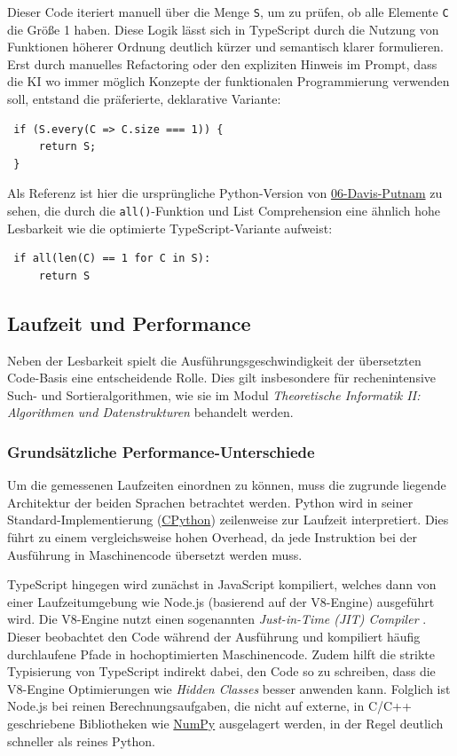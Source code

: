 Dieser Code iteriert manuell über die Menge \texttt{S}, um zu prüfen, ob alle Elemente \texttt{C} die Größe 1 haben. Diese Logik lässt sich in TypeScript durch die Nutzung von Funktionen höherer Ordnung deutlich kürzer und semantisch klarer formulieren. Erst durch manuelles Refactoring oder den expliziten Hinweis im Prompt, dass die KI wo immer möglich Konzepte der funktionalen Programmierung verwenden soll, entstand die präferierte, deklarative Variante:
\begin{verbatim}
 if (S.every(C => C.size === 1)) {
     return S;
 }
\end{verbatim}


Als Referenz ist hier die ursprüngliche Python-Version von \href{https://github.com/karlstroetmann/Logic/blob/master/Python/Chapter-4/06-Davis-Putnam.ipynb}{06-Davis-Putnam} zu sehen, die durch die \texttt{all()}-Funktion und List Comprehension eine ähnlich hohe Lesbarkeit wie die optimierte TypeScript-Variante aufweist:
\begin{verbatim}
 if all(len(C) == 1 for C in S):
     return S
\end{verbatim}


\subsection{Laufzeit und Performance}
Neben der Lesbarkeit spielt die Ausführungsgeschwindigkeit der übersetzten Code-Basis eine entscheidende Rolle. Dies gilt insbesondere für rechenintensive Such- und Sortieralgorithmen, wie sie im Modul \textit{Theoretische Informatik II: Algorithmen und Datenstrukturen} behandelt werden. 

\subsubsection{Grundsätzliche Performance-Unterschiede}
Um die gemessenen Laufzeiten einordnen zu können, muss die zugrunde liegende Architektur der beiden Sprachen betrachtet werden. Python wird in seiner Standard-Implementierung (\href{https://en.wikipedia.org/wiki/CPython}{CPython}) zeilenweise zur Laufzeit interpretiert. Dies führt zu einem vergleichsweise hohen Overhead, da jede Instruktion bei der Ausführung in Maschinencode übersetzt werden muss. 

TypeScript hingegen wird zunächst in JavaScript kompiliert, welches dann von einer Laufzeitumgebung wie Node.js (basierend auf der V8-Engine) ausgeführt wird. Die V8-Engine nutzt einen sogenannten \textit{Just-in-Time (JIT) Compiler} \cite{v8-jit}. Dieser beobachtet den Code während der Ausführung und kompiliert häufig durchlaufene Pfade in hochoptimierten Maschinencode. Zudem hilft die strikte Typisierung von TypeScript indirekt dabei, den Code so zu schreiben, dass die V8-Engine Optimierungen wie \textit{Hidden Classes} besser anwenden kann. Folglich ist Node.js bei reinen Berechnungsaufgaben, die nicht auf externe, in C/C++ geschriebene Bibliotheken wie \href{https://numpy.org/}{NumPy} ausgelagert werden, in der Regel deutlich schneller als reines Python.

